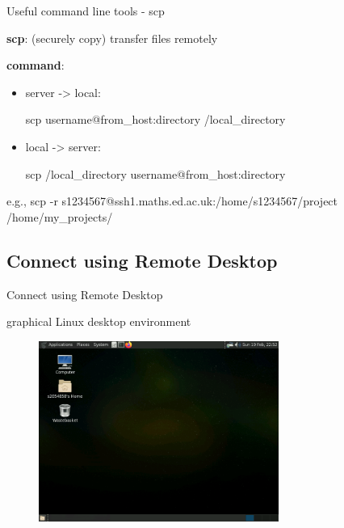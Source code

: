 \documentclass[10pt]{beamer}
\begin{document}
\begin{frame}[fragile]{Useful command line tools - scp}

\textbf{scp}: (securely copy) transfer files remotely

\hfill

\textbf{command}: 
\begin{itemize}
    \item {server -> local: 
    
    scp username@from\_host:directory /local\_directory}
    \item {local -> server: 
    
    scp /local\_directory username@from\_host:directory}
\end{itemize}

\quad e.g., scp -r s1234567@ssh1.maths.ed.ac.uk:/home/s1234567/project /home/my\_projects/

\end{frame}

\subsection{Connect using Remote Desktop}

\begin{frame}[fragile]{Connect using Remote Desktop\footnotemark}

graphical Linux desktop environment

\begin{figure}[!ht]
\centering
\includegraphics[width = 0.7\textwidth]{images/Remote_Desktop.png}
\end{figure}


\end{frame}
\end{document}
